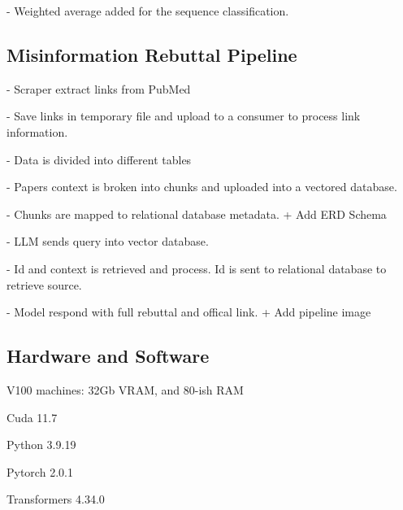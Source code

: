 \documentclass[chapters]{IEEEtran}
\begin{document}
- Weighted average added for the sequence classification.

\subsection{Misinformation Rebuttal Pipeline}




- Scraper extract links from PubMed

- Save links in temporary file and upload to a consumer to 
process link information.

- Data is divided into different tables

- Papers context is broken into chunks and uploaded into a vectored database.

- Chunks are mapped to relational database metadata.
    + Add ERD Schema
    
- LLM sends query into vector database.

- Id and context is retrieved and process. Id is sent to relational database to retrieve source.

- Model respond with full rebuttal and offical link.
    + Add pipeline image

\subsection{Hardware and Software}
\list{-}
    \item V100 machines: 32Gb VRAM, and 80-ish RAM
    \item Cuda 11.7
    \item Python 3.9.19
    \item Pytorch 2.0.1
    \item Transformers 4.34.0
\end{document}
